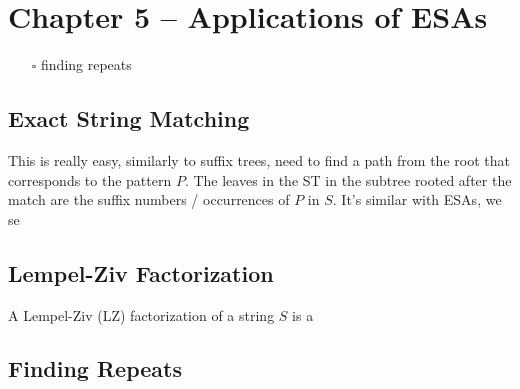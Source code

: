 \hypertarget{chapter-5-applications-of-esas}{%
\section{Chapter 5 -- Applications of ESAs}\label{chapter-5-applications-of-esas}}

\begin{itemize}
\tightlist
\item[$\square$]
  finding repeats
\end{itemize}

\hypertarget{exact-string-matching}{%
\subsection{Exact String Matching}\label{exact-string-matching}}

This is really easy, similarly to suffix trees, need to find a path from the root that corresponds to the pattern $P$. The leaves in the ST in the subtree rooted after the match are the suffix numbers / occurrences of $P$ in $S$. It's similar with ESAs, we se

\hypertarget{lempel-ziv-factorization}{%
\subsection{Lempel-Ziv Factorization}\label{lempel-ziv-factorization}}

A Lempel-Ziv (LZ) factorization of a string $S$ is a

\hypertarget{finding-repeats}{%
\subsection{Finding Repeats}\label{finding-repeats}}

